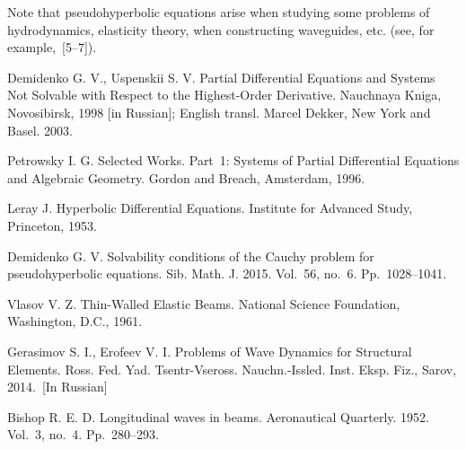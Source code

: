 \documentclass[12pt]{llncs}
\begin{document}
Note that pseudohyperbolic equations arise when studying some problems
of hydrodynamics, elasticity theory, when constructing waveguides, etc.
(see, for example,~[5--7]).

\begin{thebibliography}{9} %

Demidenko G. V., Uspenskii S. V. 
Partial Differential Equations and Systems Not Solvable with Respect to the Highest-Order Derivative. 
Nauchnaya Kniga, Novosibirsk, 1998 [in Russian]; English transl. Marcel Dekker, New York and Basel. 2003.

Petrowsky I. G.
Selected Works. Part~1: Systems of Partial Differential Equations
and Algebraic Geometry.
Gordon and Breach, Amsterdam, 1996.

Leray J.
Hyperbolic Differential Equations.
Institute for Advanced Study, Princeton, 1953.

Demidenko G. V.
Solvability conditions of the Cauchy problem
for pseudohyperbolic equations. Sib. Math. J.
2015. Vol.~56, no.~6. Pp.~1028--1041.

Vlasov V. Z.
Thin-Walled Elastic Beams. 
National Science Foundation, Washington, D.C., 1961.

Gerasimov S. I., Erofeev V. I.
Problems of Wave Dynamics for Structural Elements. 
Ross. Fed. Yad. Tsentr-Vseross. Nauchn.-Issled. Inst. Eksp. Fiz.,
Sarov, 2014.~[In Russian]

Bishop R. E. D.
Longitudinal waves in beams.
Aeronautical Quarterly.
1952. Vol.~3, no.~4. Pp.~280--293. 

\end{thebibliography}

\end{document}
